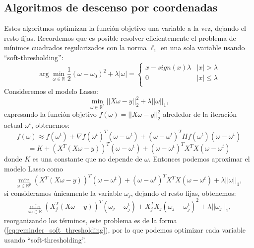 \documentclass[12pt,draftcls, onecolumn, letterpaper,compsoc]{IEEEtran}
\begin{document}
\subsection{Algoritmos de descenso por coordenadas}
Estos algoritmos optimizan la funci\'{o}n objetivo una variable a la vez, dejando el resto fijas. Recordemos que es posible resolver eficientemente el problema de m\'{i}nimos cuadrados regularizados con la norma $\ell_1$ en una sola variable usando ``soft-thresholding'':
\begin{equation}\label{eq:reminder_soft_thresholding}
    \arg\min_{\omega \in \mathbb{R}} \frac{1}{2}(\omega - \omega_0)^2 + \lambda|\omega| = \left\lbrace\begin{array}{ll}
            x-sign(x)\lambda & |x|>\lambda\\
            0 & |x|\leq \lambda\\
        \end{array}\right.
\end{equation}
Consideremos el modelo Lasso:
\begin{displaymath}
    \min_{\omega \in \mathbb{R}^{p}} ||X\omega -y||_2^{2} + \lambda||\omega||_1,
\end{displaymath}
expresando la funci\'{o}n objetivo $f(\omega)=||X\omega -y||_2^{2}$ alrededor de la iteraci\'{o}n actual $\omega^{t}$, obtenemos:
\begin{displaymath}
    f(\omega)\approx f(\omega^{t}) + \nabla f(\omega^{t})^T(\omega - \omega^t) + (\omega - \omega^t)^T Hf(\omega^t)(\omega - \omega^t)
\end{displaymath}
\begin{displaymath}
    =K + (X^T(X\omega - y))^T(\omega - \omega^t) + (\omega - \omega^t)^T X^TX(\omega - \omega^t)
\end{displaymath}
donde $K$ es una constante que no depende de $\omega$. Entonces podemos aproximar el modelo Lasso como
\begin{displaymath}
    \min_{\omega \in \mathbb{R}^{p}} (X^T(X\omega - y))^T(\omega - \omega^t) + (\omega - \omega^t)^T X^TX(\omega - \omega^t) + \lambda||\omega||_1,
\end{displaymath}
si consideramos \'{u}nicamente la variable $\omega_j$, dejando el resto fijas, obtenemos:
\begin{displaymath}
    \min_{\omega_j \in \mathbb{R}} (X_j^T(X\omega - y))^T(\omega_j - \omega_j^t) + X_j^TX_j(\omega_j - \omega_j^t)^2 + \lambda||\omega_j||_1,
\end{displaymath}
reorganizando los t\'{e}rminos, este problema es de la forma (\ref{eq:reminder_soft_thresholding}), por lo que podemos optimizar cada variable usando ``soft-thresholding''.
\end{document}
